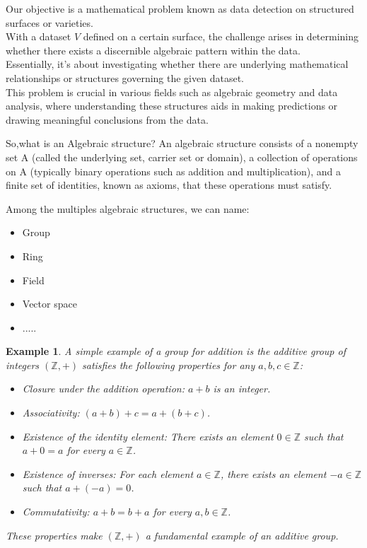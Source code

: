 \documentclass{article}
\newtheorem{Example}{Example}
\begin{document}
    Our objective is a mathematical problem known 
        as data detection on structured surfaces or 
        varieties.  \\
        With a dataset $V$ 
        defined on a certain surface, the challenge 
        arises in determining whether there exists a 
        discernible algebraic pattern within the data. 
        \\ 
        Essentially, it's about investigating whether 
        there are underlying mathematical relationships 
        or structures governing the given dataset. 
        \\ 
        This problem is crucial in various fields 
        such as algebraic geometry and data analysis, 
        where understanding these structures aids in 
        making predictions or drawing meaningful 
        conclusions from the data.



    So,what is an Algebraic structure? An algebraic structure consists of a nonempty set A (called the underlying set, carrier set or domain), a collection of operations on A (typically binary operations such as addition and multiplication), and a finite set of identities, known as axioms, that these operations must satisfy.

    Among the multiples algebraic structures, we can name:
    \begin{itemize}
        \item Group
        \item Ring
        \item Field
        \item Vector space
                \item .....
            \end{itemize}

        \begin{Example}
            A simple example of a group for 
            addition is the additive group 
            of integers $ (\mathbb{Z}, +) $ 
            satisfies the following properties 
            for any $ a, b, c \in \mathbb{Z} $:
            \begin{itemize}
                \item Closure under the addition operation: $ a + b $ is an integer.
                \item Associativity: $ (a + b) + c = a + (b + c) $.
                \item Existence of the identity element: There exists an element $ 0 \in \mathbb{Z} $ such that $ a + 0 = a $ for every $ a \in \mathbb{Z} $.
                \item Existence of inverses: For each element $ a \in \mathbb{Z} $, there exists an element $ -a \in \mathbb{Z} $ such that $ a + (-a) = 0 $.
                \item Commutativity: $ a + b = b + a $ for every $ a, b \in \mathbb{Z} $.
            \end{itemize}
        These properties make $ (\mathbb{Z}, +) $ a fundamental example of an additive group.
            
        \end{Example}  
\end{document}
